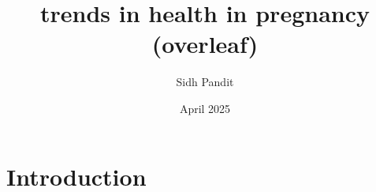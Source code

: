 \documentclass{article}
\title{trends in health in pregnancy (overleaf)}
\author{Sidh Pandit}
\date{April 2025}
\begin{document}
\maketitle

\section{Introduction}
\end{document}
